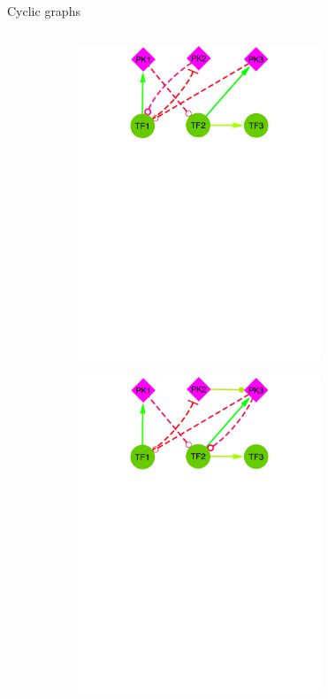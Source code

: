 \begin{frame}{Cyclic graphs}
\begin{columns}
\begin{column}{0.6\textwidth}
\begin{figure}[ht]
\centering
\begin{subfigure}[b]{0.4\textwidth}\centering\caption{}
\includegraphics[width=0.8\textwidth]{analysis/fig/cyclic_2.pdf}\label{fig:toy_infer.a}
\end{subfigure}
\quad
\begin{subfigure}[b]{0.4\textwidth}\centering\caption{}
\includegraphics[width=0.8\textwidth]{analysis/fig/cyclic_3.pdf}\label{fig:toy_infer.b}

\end{subfigure}
\end{figure}
\end{column}
\end{columns}
\end{frame}
